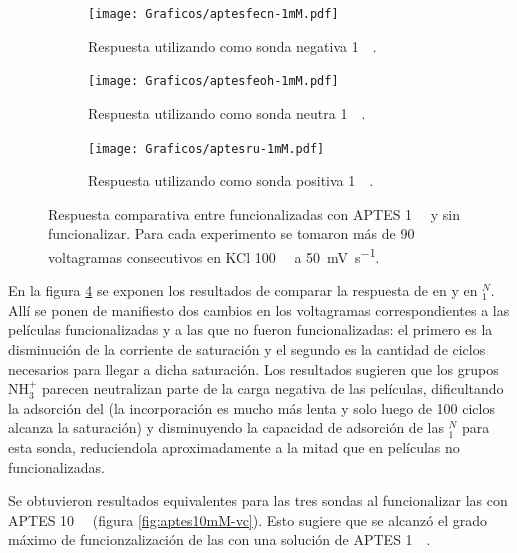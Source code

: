 				 \begin{figure}[ht!]	
					\begin{subfigure}[t]{0.495\textwidth}
			 	    \texttt{[image: Graficos/aptesfecn-1mM.pdf]}
			        \caption{Respuesta utilizando como sonda negativa \ferroferri\space \SI{1}{\milli\Molar}.}
			        \label{fig:aptes1mM-vc-fe}
			        \end{subfigure}
			        \begin{subfigure}[t]{0.495\textwidth}
			 	    \texttt{[image: Graficos/aptesfeoh-1mM.pdf]}
			        \caption{Respuesta utilizando como sonda neutra \fc\space \SI{1}{\milli\Molar}.}
			        \label{fig:aptes1mM-vc-fc}
			        \end{subfigure}
			        \begin{center}
			        \begin{subfigure}[t]{0.60\textwidth}
			 	    \texttt{[image: Graficos/aptesru-1mM.pdf]}
			        \caption{Respuesta utilizando como sonda positiva \aminorutenio\space \SI{1}{\milli\Molar}.}
			        \label{fig:aptes1mM-vc-ru}
			        \end{subfigure}
			        \end{center}
			        \caption[Voltagramas de \pdmZ$^P_3$ con \aminorutenio\space y \ferroferri]{Respuesta comparativa entre \pdmZ\space funcionalizadas con APTES \SI{1}{\milli\Molar} y sin funcionalizar. Para cada experimento se tomaron más de 90 voltagramas consecutivos en KCl \SI{100}{\milli\Molar} a \SI{50}{\milli\volt\per\second}.}
			        \label{fig:aptes1mM-vc}
			      	\end{figure}

		  
		  En la figura \ref{fig:aptes1mM-vc} se exponen los resultados de comparar la respuesta de \ru\space en \pdmZ\space y en \pdmZ$^N_1$. Allí se ponen de manifiesto dos cambios en los voltagramas correspondientes a las películas funcionalizadas y a las que no fueron funcionalizadas: el primero es la disminución de la corriente de saturación y el segundo es la cantidad de ciclos necesarios para llegar a dicha saturación. Los resultados sugieren que los grupos NH$_3^+$ parecen neutralizan parte de la carga negativa de las películas, dificultando la adsorción del \ru\space (la incorporación es mucho más lenta y solo luego de 100 ciclos alcanza la saturación) y disminuyendo la capacidad de adsorción de las \pdmZ$^N_{1}$ para esta sonda, reduciendola aproximadamente a la mitad que en películas no funcionalizadas. 

		  Se obtuvieron resultados equivalentes para las tres sondas al funcionalizar las \pdmZ\space con APTES \SI{10}{\milli\Molar} (figura \ref{fig:aptes10mM-vc}). Esto sugiere que se alcanzó el grado máximo de funcionzalización de las \pdmZ\space con una solución de APTES \SI{1}{\milli\Molar}.

